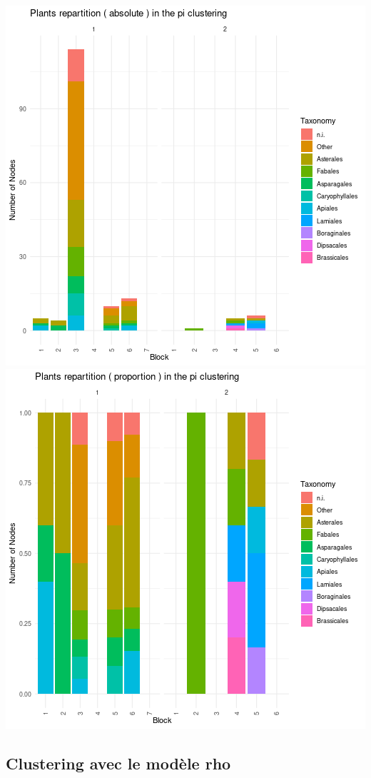 \includegraphics{figure/pi_plot_taxonomy_plants-1.png}\includegraphics{figure/pi_plot_taxonomy_plants-2.png}

\hypertarget{clustering-avec-le-moduxe8le-rho}{%
\subsection{Clustering avec le modèle
rho}\label{clustering-avec-le-moduxe8le-rho}}

